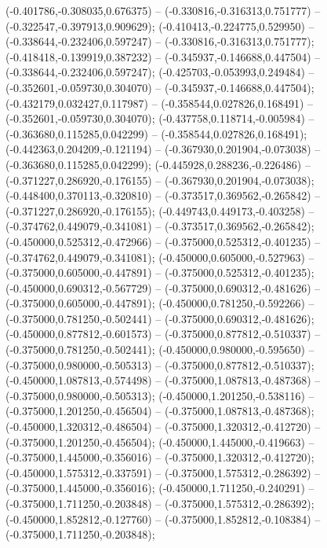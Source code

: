  (-0.401786,-0.308035,0.676375) -- (-0.330816,-0.316313,0.751777) -- (-0.322547,-0.397913,0.909629);
 (-0.410413,-0.224775,0.529950) -- (-0.338644,-0.232406,0.597247) -- (-0.330816,-0.316313,0.751777);
 (-0.418418,-0.139919,0.387232) -- (-0.345937,-0.146688,0.447504) -- (-0.338644,-0.232406,0.597247);
 (-0.425703,-0.053993,0.249484) -- (-0.352601,-0.059730,0.304070) -- (-0.345937,-0.146688,0.447504);
 (-0.432179,0.032427,0.117987) -- (-0.358544,0.027826,0.168491) -- (-0.352601,-0.059730,0.304070);
 (-0.437758,0.118714,-0.005984) -- (-0.363680,0.115285,0.042299) -- (-0.358544,0.027826,0.168491);
 (-0.442363,0.204209,-0.121194) -- (-0.367930,0.201904,-0.073038) -- (-0.363680,0.115285,0.042299);
 (-0.445928,0.288236,-0.226486) -- (-0.371227,0.286920,-0.176155) -- (-0.367930,0.201904,-0.073038);
 (-0.448400,0.370113,-0.320810) -- (-0.373517,0.369562,-0.265842) -- (-0.371227,0.286920,-0.176155);
 (-0.449743,0.449173,-0.403258) -- (-0.374762,0.449079,-0.341081) -- (-0.373517,0.369562,-0.265842);
 (-0.450000,0.525312,-0.472966) -- (-0.375000,0.525312,-0.401235) -- (-0.374762,0.449079,-0.341081);
 (-0.450000,0.605000,-0.527963) -- (-0.375000,0.605000,-0.447891) -- (-0.375000,0.525312,-0.401235);
 (-0.450000,0.690312,-0.567729) -- (-0.375000,0.690312,-0.481626) -- (-0.375000,0.605000,-0.447891);
 (-0.450000,0.781250,-0.592266) -- (-0.375000,0.781250,-0.502441) -- (-0.375000,0.690312,-0.481626);
 (-0.450000,0.877812,-0.601573) -- (-0.375000,0.877812,-0.510337) -- (-0.375000,0.781250,-0.502441);
 (-0.450000,0.980000,-0.595650) -- (-0.375000,0.980000,-0.505313) -- (-0.375000,0.877812,-0.510337);
 (-0.450000,1.087813,-0.574498) -- (-0.375000,1.087813,-0.487368) -- (-0.375000,0.980000,-0.505313);
 (-0.450000,1.201250,-0.538116) -- (-0.375000,1.201250,-0.456504) -- (-0.375000,1.087813,-0.487368);
 (-0.450000,1.320312,-0.486504) -- (-0.375000,1.320312,-0.412720) -- (-0.375000,1.201250,-0.456504);
 (-0.450000,1.445000,-0.419663) -- (-0.375000,1.445000,-0.356016) -- (-0.375000,1.320312,-0.412720);
 (-0.450000,1.575312,-0.337591) -- (-0.375000,1.575312,-0.286392) -- (-0.375000,1.445000,-0.356016);
 (-0.450000,1.711250,-0.240291) -- (-0.375000,1.711250,-0.203848) -- (-0.375000,1.575312,-0.286392);
 (-0.450000,1.852812,-0.127760) -- (-0.375000,1.852812,-0.108384) -- (-0.375000,1.711250,-0.203848);

